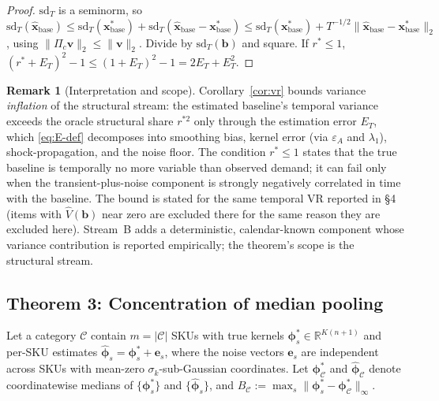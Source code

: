 \documentclass[10pt]{article} %
\theoremstyle{plain}
\theoremstyle{definition}
\newtheorem{remark}{Remark}
\begin{document}
\begin{proof}
$\mathrm{sd}_{T}$ is a seminorm, so
$\mathrm{sd}_{T}(\hat{\mathbf{x}}_{\mathrm{base}})
\le \mathrm{sd}_{T}(\mathbf{x}^{*}_{\mathrm{base}})
+ \mathrm{sd}_{T}(\hat{\mathbf{x}}_{\mathrm{base}}
-\mathbf{x}^{*}_{\mathrm{base}})
\le \mathrm{sd}_{T}(\mathbf{x}^{*}_{\mathrm{base}})
+ T^{-1/2}\|\hat{\mathbf{x}}_{\mathrm{base}}
-\mathbf{x}^{*}_{\mathrm{base}}\|_{2}$, using
$\|\Pi_{c}\mathbf{v}\|_{2}\le\|\mathbf{v}\|_{2}$. Divide by
$\mathrm{sd}_{T}(\mathbf{b})$ and square. If $r^{*}\le 1$,
$(r^{*}+E_{T})^{2}-1 \le (1+E_{T})^{2}-1 = 2E_{T}+E_{T}^{2}$.
\end{proof}

\begin{remark}[Interpretation and scope]
Corollary~\ref{cor:vr} bounds variance \emph{inflation} of the
structural stream: the estimated baseline's temporal variance exceeds
the oracle structural share $r^{*2}$ only through the estimation error
$E_{T}$, which \eqref{eq:E-def} decomposes into smoothing bias, kernel
error (via $\varepsilon_{A}$ and $\lambda_{1}$), shock-propagation,
and the noise floor. The condition $r^{*}\le 1$ states that the true
baseline is temporally no more variable than observed demand; it can
fail only when the transient-plus-noise component is strongly
negatively correlated in time with the baseline. The bound is stated
for the same temporal VR reported in \S4 (items with
$\widehat{V}(\mathbf{b})$ near zero are excluded there for the same
reason they are excluded here). Stream~B adds a deterministic,
calendar-known component whose variance contribution is reported
empirically; the theorem's scope is the structural stream.
\end{remark}

\subsection{Theorem 3: Concentration of median pooling}

Let a category $\mathcal{C}$ contain $m=|\mathcal{C}|$ SKUs with true
kernels $\boldsymbol{\phi}^{*}_{s}\in\mathbb{R}^{K(n+1)}$ and per-SKU
estimates $\hat{\boldsymbol{\phi}}_{s}
= \boldsymbol{\phi}^{*}_{s}+\mathbf{e}_{s}$, where the noise vectors
$\mathbf{e}_{s}$ are independent across SKUs with mean-zero
$\sigma_{k}$-sub-Gaussian coordinates. Let
$\boldsymbol{\phi}^{*}_{\mathcal{C}}$ and
$\hat{\boldsymbol{\phi}}_{\mathcal{C}}$ denote coordinatewise medians
of $\{\boldsymbol{\phi}^{*}_{s}\}$ and
$\{\hat{\boldsymbol{\phi}}_{s}\}$, and
$B_{\mathcal{C}} := \max_{s}\|\boldsymbol{\phi}^{*}_{s}
-\boldsymbol{\phi}^{*}_{\mathcal{C}}\|_{\infty}$.
\end{document}
